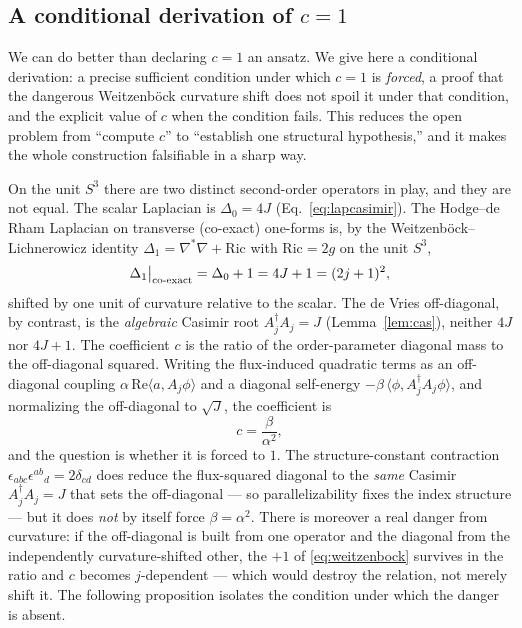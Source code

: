 \documentclass[11pt]{article}
\theoremstyle{plain}
\theoremstyle{definition}
\begin{document}
\subsection{A conditional derivation of $c=1$}
\label{sec:cderivation}

We can do better than declaring $c=1$ an ansatz. We give here a conditional
derivation: a precise sufficient condition under which $c=1$ is \emph{forced},
a proof that the dangerous Weitzenb\"ock curvature shift does not spoil it
under that condition, and the explicit value of $c$ when the condition fails.
This reduces the open problem from ``compute $c$'' to ``establish one
structural hypothesis,'' and it makes the whole construction falsifiable in a
sharp way.

On the unit $S^3$ there are two distinct second-order operators in play, and
they are not equal. The scalar Laplacian is $\Delta_0=4J$
(Eq.~\eqref{eq:lapcasimir}). The Hodge--de Rham Laplacian on transverse
(co-exact) one-forms is, by the Weitzenb\"ock--Lichnerowicz identity
$\Delta_1=\nabla^*\nabla+\mathrm{Ric}$ with $\mathrm{Ric}=2g$ on the unit
$S^3$,
\begin{equation}
\Delta_1\big|_{\rm co\text{-}exact}=\Delta_0+1=4J+1=(2j+1)^2,
\label{eq:weitzenbock}
\end{equation}
shifted by one unit of curvature relative to the scalar. The de Vries
off-diagonal, by contrast, is the \emph{algebraic} Casimir root
$A_j^\dagger A_j=J$ (Lemma~\ref{lem:cas}), neither $4J$ nor $4J+1$. The
coefficient $c$ is the ratio of the order-parameter diagonal mass to the
off-diagonal squared. Writing the flux-induced quadratic terms as an
off-diagonal coupling $\alpha\,\mathrm{Re}\langle a,A_j\phi\rangle$ and a
diagonal self-energy $-\beta\,\langle\phi,A_j^\dagger A_j\phi\rangle$, and
normalizing the off-diagonal to $\sqrt J$, the coefficient is
\begin{equation}
c=\frac{\beta}{\alpha^2},
\label{eq:cratio}
\end{equation}
and the question is whether it is forced to $1$. The structure-constant
contraction $\epsilon_{abc}\epsilon^{ab}{}_{d}=2\delta_{cd}$ does reduce the
flux-squared diagonal to the \emph{same} Casimir $A_j^\dagger A_j=J$ that sets
the off-diagonal --- so parallelizability fixes the index structure --- but it
does \emph{not} by itself force $\beta=\alpha^2$. There is moreover a real
danger from curvature: if the off-diagonal is built from one operator and the
diagonal from the independently curvature-shifted other, the $+1$ of
\eqref{eq:weitzenbock} survives in the ratio and $c$ becomes $j$-dependent ---
which would destroy the relation, not merely shift it. The following
proposition isolates the condition under which the danger is absent.
\end{document}
